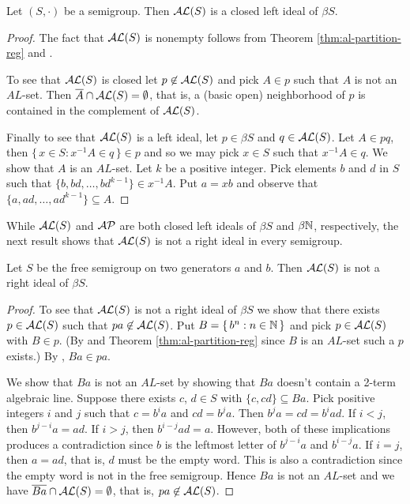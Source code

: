 \begin{thm}
  Let $(S, \cdot)$ be a semigroup.
  Then $\mathcal{AL}(S)$ is a closed left ideal of $\beta S$.
\end{thm}
\begin{proof}
  The fact that $\mathcal{AL}(S)$ is nonempty follows from Theorem \ref{thm:al-partition-reg} and \cite[Theorem 3.11]{Hindman:1998fk}. 

  To see that $\mathcal{AL}(S)$ is closed let $p \not\in \mathcal{AL}(S)$ and pick $A \in p$ such that $A$ is not an $AL$-set.
  Then $\overline{A} \cap \mathcal{AL}(S) = \emptyset$, that is, a (basic open) neighborhood of $p$ is contained in the complement of $\mathcal{AL}(S)$.

  Finally to see that $\mathcal{AL}(S)$ is a left ideal, let $p \in \beta S$ and $q \in \mathcal{AL}(S)$. 
  Let $A \in pq$, then $\{\, x \in S : x^{-1}A \in q \,\} \in p$ and so we may pick $x \in S$ such that $x^{-1}A \in q$. 
  We show that $A$ is an $AL$-set.
  Let $k$ be a positive integer.
  Pick elements $b$ and $d$ in $S$ such that $\{b, bd, \ldots, bd^{k-1}\} \in x^{-1}A$.
  Put $a = xb$ and observe that $\{a, ad, \ldots, ad^{k-1}\} \subseteq A$.
\end{proof}

While $\mathcal{AL}(S)$ and $\mathcal{AP}$ are both closed left ideals of $\beta S$ and $\beta \mathbb{N}$, respectively, the next result shows that $\mathcal{AL}(S)$ is not a right ideal in every semigroup. 

\begin{thm}
  \label{thm:AL-not-left-ideal}
  Let $S$ be the free semigroup on two generators $a$ and $b$.
  Then $\mathcal{AL}(S)$ is not a right ideal of $\beta S$.
\end{thm}
\begin{proof}
  To see that $\mathcal{AL}(S)$ is not a right ideal of $\beta S$ we show that there exists $p \in \mathcal{AL}(S)$ such that $pa \not\in \mathcal{AL}(S)$. 
  Put $B = \{\, b^n : n \in \mathbb{N} \,\}$ and pick $p \in \mathcal{AL}(S)$ with $B \in p$. 
  (By \cite[Theorem 3.11]{Hindman:1998fk} and Theorem \ref{thm:al-partition-reg} since $B$ is an $AL$-set such a $p$ exists.)
  By \cite[Exercise 4.1.8(b)]{Hindman:1998fk}, $Ba \in pa$. 

  We show that $Ba$ is not an $AL$-set by showing that $Ba$ doesn't contain a 2-term algebraic line. 
  Suppose there exists $c$, $d \in S$ with $\{c, cd\} \subseteq Ba$. 
  Pick positive integers $i$ and $j$ such that $c = b^ia$ and $cd = b^ja$.
  Then $b^ja = cd = b^iad$.
  If $i < j$, then $b^{j-i}a = ad$.
  If $i > j$, then $b^{i-j}ad = a$.
  However, both of these implications produces a contradiction since $b$ is the leftmost letter of $b^{j-i}a$ and $b^{i-j}a$.
  If $i = j$, then $a = ad$, that is, $d$ must be the empty word.
  This is also a contradiction since the empty word is not in the free semigroup.
  Hence $Ba$ is not an $AL$-set and we have $\overline{Ba} \cap \mathcal{AL}(S) = \emptyset$, that is, $pa \not\in \mathcal{AL}(S)$. 
\end{proof}

